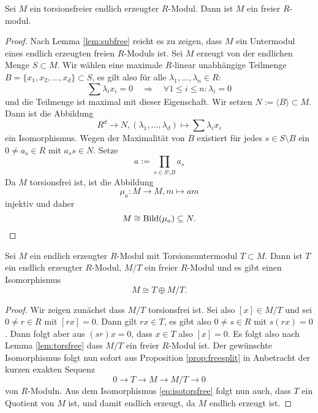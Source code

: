 \documentclass{book}
\begin{document}
\begin{lem}
    \label{lem:torsfree}
    Sei $M$ ein torsionsfreier endlich erzeugter $R$-Modul. Dann ist $M$ ein freier $R$-modul.
\end{lem}
\begin{proof}
    Nach Lemma \ref{lem:subfree} reicht es zu zeigen, dass $M$ ein Untermodul
    eines endlich erzeugten freien $R$-Moduls ist. Sei $M$ erzeugt von der
    endlichen Menge $S \subset M$. Wir wählen eine maximale $R$-linear
    unabhängige Teilmenge $B = \{x_1, x_2, ..., x_d \} \subset S$, es gilt also für alle $\lambda_1, ..., \lambda_n \in R$:
    \[
        \sum \lambda_i x_i = 0 \quad \Rightarrow \quad \forall 1 \le i \le n: \lambda_i = 0
    \]
    und die Teilmenge ist maximal mit dieser Eigenschaft. Wir setzen $N := \langle B \rangle \subset M$. Dann ist die Abbildung
    \[
        R^d \to N, (\lambda_1, ..., \lambda_d) \mapsto \sum \lambda_i x_i
    \]
    ein Isomorphismus. Wegen der Maximalität von $B$ existiert für jedes $s \in
    S \setminus B$ ein $0 \ne a_s \in R$ mit $a_s s \in N$. Setze
    \[
        a := \prod_{s \in S \setminus B} a_s
    \]
    Da $M$ torsionsfrei ist, ist die Abbildung 
    \[
        \mu_a: M \to M, m \mapsto am
    \]
    injektiv und daher
    \[
        M \cong \operatorname{Bild}(\mu_a) \subseteq N.
    \]
\end{proof}

\begin{lem}
    \label{lem:tfree}
    Sei $M$ ein endlich erzeugter $R$-Modul mit Torsionsuntermodul $T \subset
    M$. Dann ist $T$ ein endlich erzeugter $R$-Modul, $M/T$ ein freier
    $R$-Modul und es gibt einen Isomorphismus
    \begin{equation}
        \label{eq:isotorsfree}
            M \cong T \oplus M/T.
    \end{equation}
\end{lem}
\begin{proof}
    Wir zeigen zunächst dass $M/T$ torsionsfrei ist. Sei also $[x] \in M/T$ und sei $0
    \ne r \in R$ mit $[rx] = 0$. Dann gilt $rx \in T$, es gibt also $0 \ne s
    \in R$ mit $s(rx) = 0$. Dann folgt aber aus $(sr)x = 0$, dass $x \in T$
    also $[x] = 0$. Es folgt also nach Lemma \ref{lem:torsfree} dass $M/T$ ein
    freier $R$-Modul ist. Der gewünschte Isomorphismus folgt nun sofort aus
    Proposition \ref{prop:freesplit} in Anbetracht der kurzen exakten Sequenz
    \[
        0 \to T \to M \to M/T \to 0
    \]
    von $R$-Moduln. Aus dem Isomorphismus \eqref{eq:isotorsfree} folgt nun
    auch, dass $T$ ein Quotient von $M$ ist, und damit endlich erzeugt, da $M$
    endlich erzeugt ist. 
\end{proof}
\end{document}
